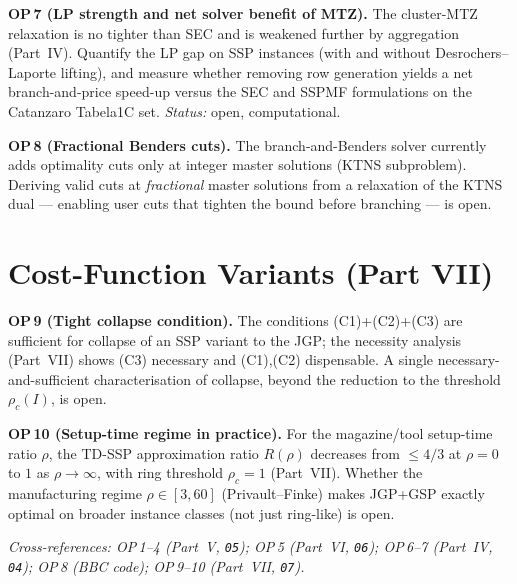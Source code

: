 \documentclass[11pt,a4paper]{article}
\begin{document}
\begin{op}
\textbf{OP\,7 (LP strength and net solver benefit of MTZ).} The cluster-MTZ relaxation is no
tighter than SEC and is weakened further by aggregation (Part~IV). Quantify the LP gap on SSP
instances (with and without Desrochers--Laporte lifting), and measure whether removing row
generation yields a net branch-and-price speed-up versus the SEC and SSPMF formulations on the
Catanzaro Tabela1C set. \emph{Status:} open, computational.
\end{op}

\begin{op}
\textbf{OP\,8 (Fractional Benders cuts).} The branch-and-Benders solver currently adds
optimality cuts only at integer master solutions (KTNS subproblem). Deriving valid cuts at
\emph{fractional} master solutions from a relaxation of the KTNS dual --- enabling user cuts
that tighten the bound before branching --- is open.
\end{op}

\section{Cost-Function Variants (Part VII)}

\begin{op}
\textbf{OP\,9 (Tight collapse condition).} The conditions (C1)+(C2)+(C3) are sufficient for
collapse of an SSP variant to the JGP; the necessity analysis (Part~VII) shows (C3) necessary
and (C1),(C2) dispensable. A single necessary-and-sufficient characterisation of collapse,
beyond the reduction to the threshold $\rho_c(I)$, is open.
\end{op}

\begin{op}
\textbf{OP\,10 (Setup-time regime in practice).} For the magazine/tool setup-time ratio
$\rho$, the TD-SSP approximation ratio $R(\rho)$ decreases from $\le 4/3$ at $\rho=0$ to $1$
as $\rho\to\infty$, with ring threshold $\rho_c=1$ (Part~VII). Whether the manufacturing
regime $\rho\in[3,60]$ (Privault--Finke) makes JGP+GSP exactly optimal on broader instance
classes (not just ring-like) is open.
\end{op}

\vspace{0.4cm}
\noindent\textit{Cross-references: OP\,1--4 (Part~V, \texttt{05}); OP\,5 (Part~VI,
\texttt{06}); OP\,6--7 (Part~IV, \texttt{04}); OP\,8 (BBC code); OP\,9--10 (Part~VII,
\texttt{07}).}
\end{document}
